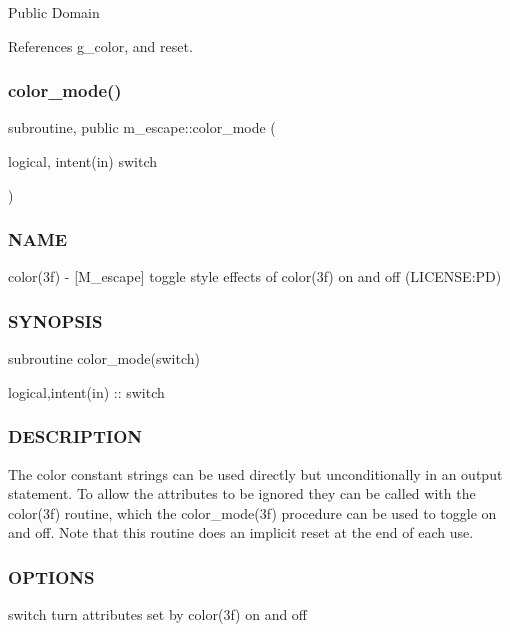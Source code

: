 Public Domain 

References g\+\_\+color, and reset.

\mbox{\label{namespacem__escape_a24566737cb6aa1672180eaa21c8d4f66}} 
\subsubsection{\texorpdfstring{color\+\_\+mode()}{color\_mode()}}
{\footnotesize\ttfamily subroutine, public m\+\_\+escape\+::color\+\_\+mode (\begin{DoxyParamCaption}\item[{logical, intent(in)}]{switch }\end{DoxyParamCaption})}



\subsubsection*{N\+A\+ME}

color(3f) -\/ \mbox{[}M\+\_\+escape\mbox{]} toggle style effects of color(3f) on and off (L\+I\+C\+E\+N\+SE\+:PD) \subsubsection*{S\+Y\+N\+O\+P\+S\+IS}

subroutine color\+\_\+mode(switch)

logical,intent(in) \+:\+: switch

\subsubsection*{D\+E\+S\+C\+R\+I\+P\+T\+I\+ON}

The color constant strings can be used directly but unconditionally in an output statement. To allow the attributes to be ignored they can be called with the color(3f) routine, which the color\+\_\+mode(3f) procedure can be used to toggle on and off. Note that this routine does an implicit reset at the end of each use.

\subsubsection*{O\+P\+T\+I\+O\+NS}

switch turn attributes set by color(3f) on and off

